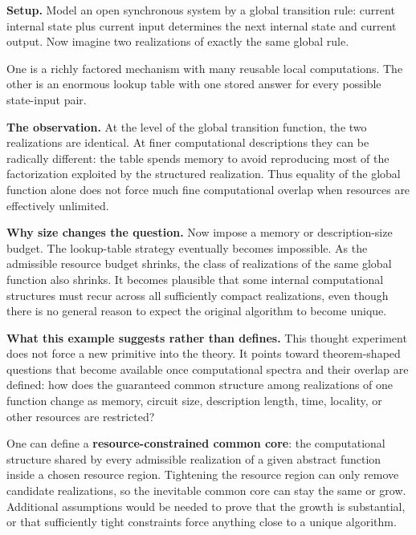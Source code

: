 \documentclass[11pt,a4paper]{article}
\newcounter{thought}
\newenvironment{thoughtbox}[1]{%
  \refstepcounter{thought}%
  \begin{tcolorbox}[
    enhanced,breakable,
    colback=white,colframe=navy,boxrule=0.85pt,
    arc=1.7mm,left=2.8mm,right=2.8mm,top=2.2mm,bottom=2.0mm,
    borderline west={2.2pt}{0pt}{blue},
    title={\large\bfseries Thought experiment \thethought: #1},
    fonttitle=\bfseries,coltitle=navy,
    attach boxed title to top left={xshift=2mm,yshift=-2mm},
    boxed title style={colback=sky,colframe=blue,boxrule=0.55pt,arc=1.2mm},
    before skip=9pt,after skip=10pt
  ]
}{\end{tcolorbox}}
\newcommand{\scene}{\medskip\textbf{Setup.} }
\begin{document}
\begin{thoughtbox}{Size constraints and computational overlap}
\scene Model an open synchronous system by a global transition rule: current internal state plus current input determines the next internal state and current output. Now imagine two realizations of exactly the same global rule.

One is a richly factored mechanism with many reusable local computations. The other is an enormous lookup table with one stored answer for every possible state-input pair.

\medskip\textbf{The observation.} At the level of the global transition function, the two realizations are identical. At finer computational descriptions they can be radically different: the table spends memory to avoid reproducing most of the factorization exploited by the structured realization. Thus equality of the global function alone does not force much fine computational overlap when resources are effectively unlimited.

\medskip\textbf{Why size changes the question.} Now impose a memory or description-size budget. The lookup-table strategy eventually becomes impossible. As the admissible resource budget shrinks, the class of realizations of the same global function also shrinks. It becomes plausible that some internal computational structures must recur across all sufficiently compact realizations, even though there is no general reason to expect the original algorithm to become unique.

\medskip\textbf{What this example suggests rather than defines.} This thought experiment does not force a new primitive into the theory. It points toward theorem-shaped questions that become available once computational spectra and their overlap are defined: how does the guaranteed common structure among realizations of one function change as memory, circuit size, description length, time, locality, or other resources are restricted?

\begin{conceptbox}[title={A theoretical direction suggested by the example}]
One can define a \textbf{resource-constrained common core}: the computational structure shared by every admissible realization of a given abstract function inside a chosen resource region. Tightening the resource region can only remove candidate realizations, so the inevitable common core can stay the same or grow. Additional assumptions would be needed to prove that the growth is substantial, or that sufficiently tight constraints force anything close to a unique algorithm.
\end{conceptbox}
\end{thoughtbox}
\end{document}
